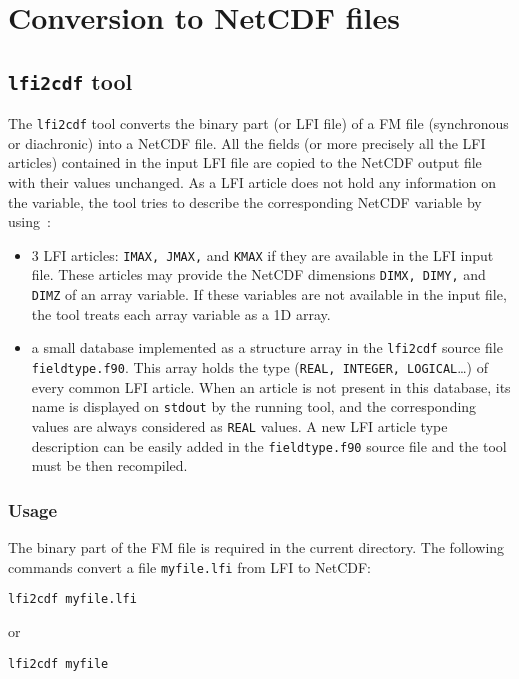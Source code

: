 \section{Conversion to NetCDF files}

\subsection{{\tt lfi2cdf} tool}

The \texttt{lfi2cdf} tool converts the binary part (or LFI file) of a
FM file (synchronous or diachronic) into a NetCDF file.  All the fields
(or more precisely all the LFI articles) contained in the input LFI file
are copied to the NetCDF output file with their values unchanged. As
a LFI article does not hold any information on the variable, the tool
tries to describe the corresponding NetCDF variable by using~:

\begin{itemize}
\item 3 LFI articles: \texttt{IMAX, JMAX,} and \texttt{KMAX}
  if they are available in the LFI input file. These articles may
  provide the NetCDF dimensions \texttt{DIMX, DIMY,} and \texttt{DIMZ}
  of an array variable. If these variables are not available in the
  input file, the tool treats each array variable as a 1D array.
\item a small database implemented as a structure array in the
  \texttt{lfi2cdf} source file \texttt{fieldtype.f90}. This array
  holds the type (\texttt{REAL, INTEGER, LOGICAL}\ldots) of every
  common LFI article. When an article is not present in this database,
  its name is displayed on \texttt{stdout} by the running tool, and
  the corresponding values are always considered as \texttt{REAL}
  values. A new LFI article type description can be easily added in
  the \texttt{fieldtype.f90} source file and the tool must be then
  recompiled.
\end{itemize}

\subsubsection{Usage}
The binary part of the FM file is required in the current directory.
The following commands convert a file \texttt{myfile.lfi} from LFI to NetCDF:

\begin{verbatim}
lfi2cdf myfile.lfi
\end{verbatim} 
or
\begin{verbatim}
lfi2cdf myfile
\end{verbatim}

